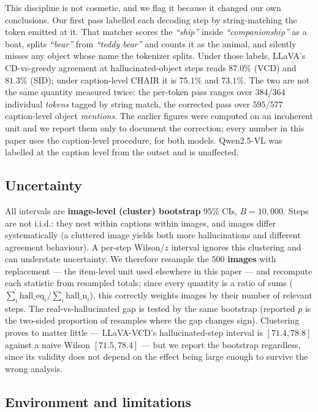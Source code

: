 \documentclass{article}
\begin{document}
This discipline is not cosmetic, and we flag it because it changed our own
conclusions. Our first pass labelled each decoding step by string-matching the
token emitted at it. That matcher scores the \emph{``ship''} inside
\emph{``companionship''} as a boat, splits \emph{``bear''} from \emph{``teddy
bear''} and counts it as the animal, and silently misses any object whose name
the tokenizer splits. Under those labels, LLaVA's CD-vs-greedy agreement at
hallucinated-object steps reads $87.0\%$ (VCD) and $81.3\%$ (SID); under
caption-level CHAIR it is $75.1\%$ and $73.1\%$. The two are not the same
quantity measured twice: the per-token pass ranges over $384$/$364$ individual
\emph{tokens} tagged by string match, the corrected pass over $595$/$577$
caption-level object \emph{mentions}. The earlier figures were computed on an
incoherent unit and we report them only to document the correction; every number
in this paper uses the caption-level procedure, for both models. Qwen2.5-VL was
labelled at the caption level from the outset and is unaffected.

\subsection{Uncertainty}
\label{subsec:cdmech-uncertainty}

All intervals are \textbf{image-level (cluster) bootstrap} $95\%$ CIs,
$B=10{,}000$. Steps are not i.i.d.: they nest within captions within images, and
images differ systematically (a cluttered image yields both more hallucinations
and different agreement behaviour). A per-step Wilson/$z$ interval ignores this
clustering and can understate uncertainty. We therefore resample the $500$
\textbf{images} with replacement --- the item-level unit used elsewhere in this
paper --- and recompute each statistic from resampled totals; since every
quantity is a ratio of sums ($\sum_i \text{hall\_eq}_i / \sum_i
\text{hall\_n}_i$), this correctly weights images by their number of relevant
steps. The real-vs-hallucinated gap is tested by the same bootstrap (reported
$p$ is the two-sided proportion of resamples where the gap changes sign).
Clustering proves to matter little --- LLaVA-VCD's hallucinated-step interval is
$[71.4, 78.8]$ against a naive Wilson $[71.5, 78.4]$ --- but we report the
bootstrap regardless, since its validity does not depend on the effect being
large enough to survive the wrong analysis.

\subsection{Environment and limitations}
\label{subsec:cdmech-limits}
\end{document}
